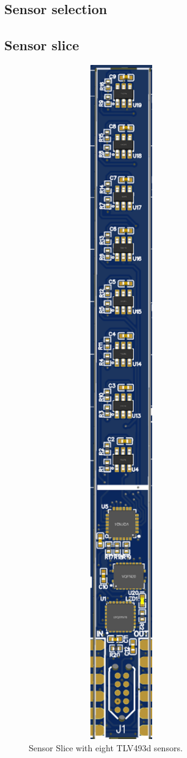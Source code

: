 \documentclass[conference]{IEEEtran}
\begin{document}
\subsection{Sensor selection}
\subsection{Sensor slice}
% 
\begin{figure}[htbp]
\centerline{\includegraphics[width=8cm]{magcam_sensor_module.png}}
\caption{Sensor Slice with eight TLV493d sensors.\cite{magcam_sensor_module}}
\label{magcam_sensor_module_fig}
\end{figure}
\end{document}
